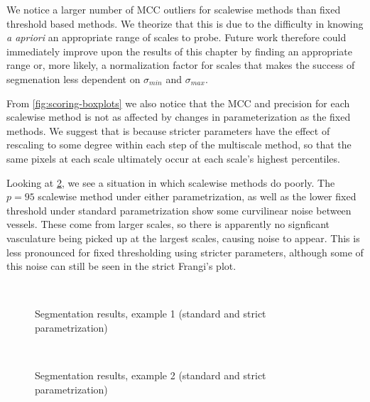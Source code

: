 We notice a larger number of MCC outliers for scalewise methods than fixed threshold based methods. We theorize that this is due to the difficulty in knowing \textit{a apriori} an appropriate range of scales to probe. Future work therefore could immediately improve upon the results of this chapter by finding an appropriate range or, more likely, a normalization factor for scales that makes the success of segmenation less dependent on $\sigma_{min}$ and $\sigma_{max}$.

From \cref{fig:scoring-boxplots} we also notice that the MCC and precision for each scalewise method is not as affected by changes in parameterization as the fixed methods. We suggest that is because stricter parameters have the effect of rescaling to some degree within each step of the multiscale method, so that the same pixels at each scale ultimately occur at each scale's highest percentiles.

Looking at \cref{fig:seg-montage-example2}, we see a situation in which scalewise methods do poorly. The $p=95$ scalewise method under either parametrization, as well as the lower fixed threshold under standard parametrization show some curvilinear noise between vessels. These come from larger scales, so there is apparently no signficant vasculature being picked up at the largest scales, causing noise to appear. This is less pronounced for fixed thresholding using stricter parameters, although some of this noise can still be seen in the strict Frangi's \Vmax plot.


\begin{figure}[p] \centering
   \\
  \caption{Segmentation results, example 1 (standard and strict parametrization)}
	\label{fig:seg-montage-example}
\end{figure}

\begin{figure}[p] \centering
	 \\[-0.5cm]
	\caption{Segmentation results, example 2 (standard and strict parametrization)}
	\label{fig:seg-montage-example2}
\end{figure}

